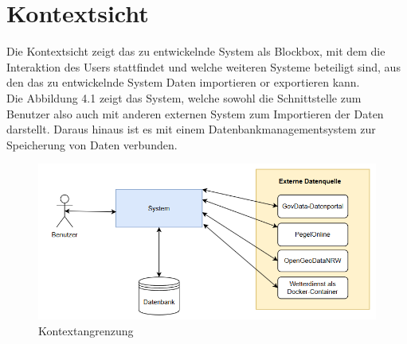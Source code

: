 \documentclass[a4paper,12pt]{scrreprt}
\begin{document}
\section*{\large \textbf{Kontextsicht}}
Die Kontextsicht zeigt das zu entwickelnde System als Blockbox, mit dem die Interaktion des Users stattfindet und welche weiteren Systeme beteiligt sind, aus den das zu entwickelnde System Daten importieren or exportieren kann.\\
Die Abbildung 4.1 zeigt das System, welche sowohl die Schnittstelle zum Benutzer  also auch mit anderen externen System zum Importieren der Daten darstellt. Daraus hinaus ist es mit einem Datenbankmanagementsystem zur Speicherung von Daten verbunden.
\begin{figure}[H]
	\centering
	\includegraphics[width=12cm]{Kontextangrenzung.png}
	\caption{\label{} Kontextangrenzung}
\end{figure}
\end{document}

